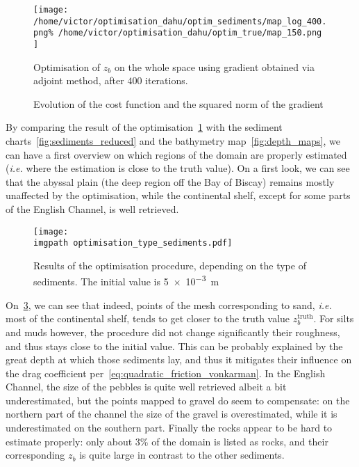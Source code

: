 \documentclass[../../Main_ManuscritThese.tex]{subfiles}
\newcommand{\zob}{z_b}
\newcommand\imgpath{/home/victor/acadwriting/Manuscrit/Text/Chapter5/img/}
\begin{document}
\begin{figure}[ht]
  \centering
  \texttt{[image: /home/victor/optimisation\_dahu/optim\_sediments/map\_log\_400.png\% /home/victor/optimisation\_dahu/optim\_true/map\_150.png
  ]}
  \caption[Optimisation of $\zob$ on the whole
  space]{\label{fig:optimization_map_399} Optimisation of $\zob$ on
    the whole space using gradient obtained via adjoint method, after
    $400$ iterations.}
\end{figure}

\begin{figure}[ht]
  \centering
  
  \caption{\label{fig:ctrl_true} Evolution of the cost function and
    the squared norm of the gradient}
\end{figure}
By comparing the result of the
optimisation~\cref{fig:optimization_map_399} with the sediment
charts~\cref{fig:sediments_reduced} and the bathymetry
map~\cref{fig:depth_maps}, we can have a first overview on which
regions of the domain are properly estimated (\emph{i.e.} where the
estimation is close to the truth value).  On a first look, we can see
that the abyssal plain (the deep region off the Bay of Biscay) remains
mostly unaffected by the optimisation, while the continental shelf,
except for some parts of the English Channel, is well retrieved.

\begin{figure}[ht]
  \centering
  \texttt{[image: \\imgpath optimisation\_type\_sediments.pdf]}
  \caption[Final values of the optimisation procedure, based on the sediment type]{\label{fig:optimisation_type_sediments} Results of the
    optimisation procedure, depending on the type of sediments. The
    initial value is \SI{5e-3}{\meter}}
\end{figure}

On~\cref{fig:optimisation_type_sediments}, we can see that indeed,
points of the mesh corresponding to sand, \emph{i.e.} most of the
continental shelf, tends to get closer to the truth value $\zob^{\mathrm{truth}}$.  For
silts and muds however, the procedure did not change significantly
their roughness, and thus stays close to the initial value. This can
be probably explained by the great depth at which those sediments lay,
and thus it mitigates their influence on the drag coefficient
per~\cref{eq:quadratic_friction_vonkarman}. In the English Channel,
the size of the pebbles is quite well retrieved albeit a bit
underestimated, but the points mapped to gravel do seem to compensate:
on the northern part of the channel the size of the gravel is
overestimated, while it is underestimated on the southern part.
Finally the rocks appear to be hard to estimate properly: only about
3\% of the domain is listed as rocks, and their corresponding $\zob$
is quite large in contrast to the other sediments.
\end{document}
